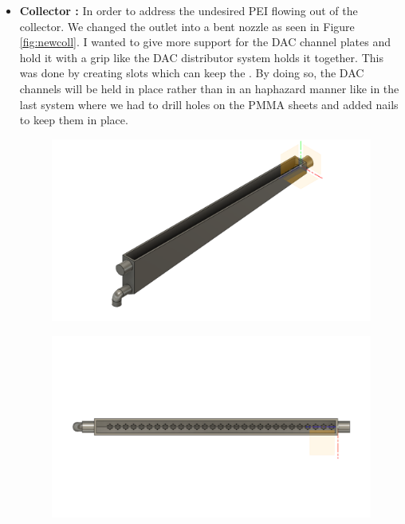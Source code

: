 \begin{itemize}
    \item \textbf{Collector :} In order to address the undesired PEI flowing out of the collector. We changed the outlet into a bent nozzle as seen in Figure \ref{fig:newcoll}. I wanted to give more support for the DAC channel plates and hold it with a grip like the DAC distributor system holds it together. This was done by creating slots which can keep the . By doing so, the DAC channels will be held in place rather than in an haphazard manner like in the last system where we had to drill holes on the PMMA sheets and added nails to keep them in place. 
    
    \begin{figure}[H]
        \centering
        \begin{minipage}{.5\textwidth}
        \centering
        \includegraphics[width=\linewidth]{images/mywork/Sprint4/Collector_main.png}
         \label{fig:newcoll}
    \end{minipage}%
    \begin{minipage}{.5\textwidth}
        \centering
        \includegraphics[width=\linewidth]{images/mywork/Sprint4/Collector_new_top.png}
        \label{fig:newcolltop}
    \end{minipage}
    \end{figure}
    

\end{itemize}
